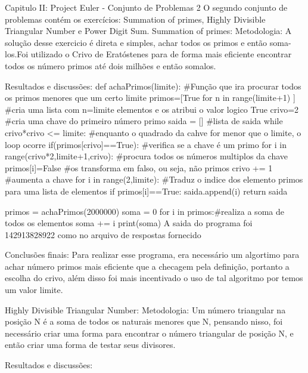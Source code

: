 Capitulo II: Project Euler - Conjunto de Problemas 2
    O segundo conjunto de problemas contém os exercícios: Summation of primes, Highly Divisible Triangular Number e Power Digit Sum.
    Summation of primes:
        Metodologia: 
            A solução desse exercicio é direta e simples, achar todos os primos e então soma-los.Foi utilizado o Crivo de Eratóstenes para de forma mais eficiente encontrar todos os número primos até dois milhões e então somalos.

        Resultados e discussões:
            def achaPrimos(limite): #Função que ira procurar todos os primos menores que um certo limite
                primos=[True for n in range(limite+1) ] #cria uma lista com n=limite elementos e os atribui o valor logico True
                crivo=2 #cria uma chave do primeiro número primo
                saida = [] #lista de saida
                while  crivo*crivo <= limite: #enquanto o quadrado da cahve for menor que o limite, o loop ocorre
                    if(primos[crivo]==True): #verifica se a chave é um primo
                        for i in range(crivo*2,limite+1,crivo): #procura todos os números multiplos da chave
                            primos[i]=False #os transforma em falso, ou seja, não primos
                    crivo += 1 #aumenta a chave 
                for i in range(2,limite): #Traduz o indice dos elemento primos para uma lista de elementos
                    if primos[i]==True:
                        saida.append(i)
                return saida
                        
            primos = achaPrimos(2000000)
            soma = 0
            for i in primos:#realiza a soma de todos os elementos
                soma += i
            print(soma)
            A saida do programa foi 142913828922 como no arquivo de respostas fornecido

        Conclusões finais:  
            Para realizar esse programa, era necessário um algortimo para achar número primos mais eficiente que a checagem pela definição, portanto a escolha do crivo, além disso foi mais incentivado o uso de tal algoritmo por temos um valor limite.

    Highly Divisible Triangular Number:
        Metodologia:
            Um número triangular na posição N é a soma de todos os naturais menores que N, pensando nisso, foi necessário criar uma forma para encontrar o número triangular de posição N, e então criar uma forma de testar seus divisores.

        Resultados e discussões:

